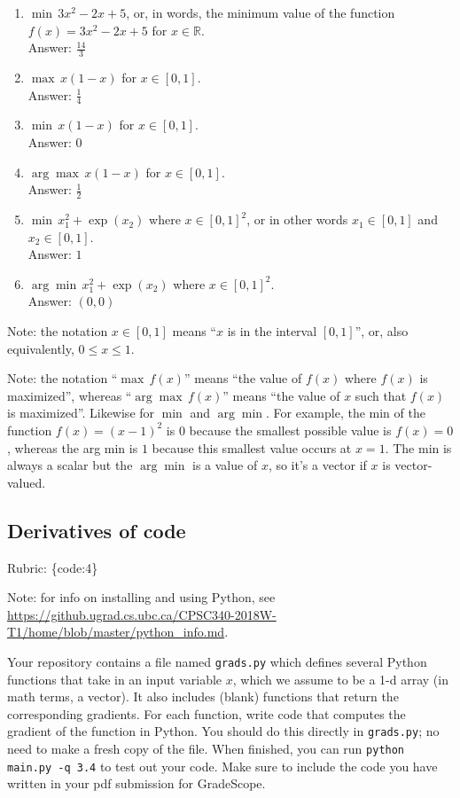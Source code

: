 \documentclass{article}
\def\rubric#1{\gre{Rubric: \{#1\}}}{}
\def\blu#1{{\color{blu}#1}}
\def\gre#1{{\color{gre}#1}}
\def\R{\mathbb{R}}
\def\ans#1{\gre{Answer: #1}}{}
\begin{document}
\begin{enumerate}
\item $\min \, 3x^2-2x+5$, or, in words, the minimum value of the function $f(x) = 3x^2 -2x + 5$ for $x \in \R$. \\
\ans{$\frac{14}{3}$}
\item $\max \, x(1-x)$ for $x\in [0,1]$. \\
\ans{$\frac{1}{4}$}
\item $\min \, x(1-x)$ for $x\in [0,1]$. \\
\ans{$0$}
\item $\arg \max \, x(1-x)$ for $x\in[0,1]$. \\
\ans{$\frac{1}{2}$} 
\item $\min \, x_1^2 + \exp(x_2)$ where $x \in [0,1]^2$, or in other words $x_1\in [0,1]$ and $x_2\in [0,1]$. \\
\ans{$1$}
\item $\arg \min \, x_1^2 + \exp(x_2)$ where $x \in [0,1]^2$. \\
\ans{$(0,0)$}
\end{enumerate}

Note: the notation $x\in [0,1]$ means ``$x$ is in the interval $[0,1]$'', or, also equivalently, $0 \leq x \leq 1$.

Note: the notation ``$\max \, f(x)$'' means ``the value of $f(x)$ where $f(x)$ is maximized'', whereas ``$\arg \max \, f(x)$'' means ``the value of $x$ such that $f(x)$ is maximized''.
Likewise for $\min$ and $\arg \min$. For example, the min of the function $f(x)=(x-1)^2$ is $0$ because the smallest possible value is $f(x)=0$, 
whereas the arg min is $1$ because this smallest value occurs at $x=1$. The min is always a scalar but the $\arg \min$ is a value of $x$, so it's a vector 
if $x$ is vector-valued.

\subsection{Derivatives of code}

\rubric{code:4}

Note: for info on installing and using Python, see \\\url{https://github.ugrad.cs.ubc.ca/CPSC340-2018W-T1/home/blob/master/python_info.md}.

Your repository contains a file named \texttt{grads.py} which defines several Python functions that take in an input variable $x$, which we assume to be a 1-d array (in math terms, a vector).
It also includes (blank) functions that return the corresponding gradients.
For each function, \blu{write code that computes the gradient of the function} in Python.
You should do this directly in \texttt{grads.py}; no need to make a fresh copy of the file. When finished, you can run \texttt{python main.py -q 3.4} to test out your code. Make sure to include the code you have written in your pdf submission for GradeScope.
\end{document}
